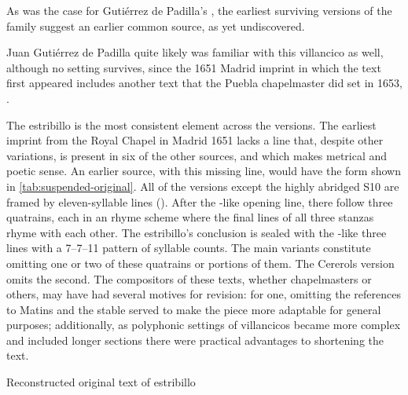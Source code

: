 As was the case for Gutiérrez de Padilla's , the earliest
surviving versions of the  family suggest an earlier
common source, as yet undiscovered.%
\begin{Footnote}
    Juan Gutiérrez de Padilla quite likely was familiar with this villancico as
    well, although no setting survives, since the 1651 Madrid imprint in which
    the text first appeared includes another text that the Puebla chapelmaster
    did set in 1653, .
\end{Footnote}
The  estribillo is the most consistent element across
the versions.
The earliest imprint from the Royal Chapel in Madrid 1651 lacks a line that,
despite other variations, is present in six of the other sources, and which
makes metrical and poetic sense.
An earlier source, with this missing line, would have the form shown in
\cref{tab:suspended-original}.
All of the versions except the highly abridged S10 are framed by eleven-syllable
lines ().
After the -like opening line, there follow three quatrains, each
in an  rhyme scheme where the final lines of all three stanzas rhyme
with each other.
The estribillo's conclusion is sealed with the -like three lines with
a 7--7--11 pattern of syllable counts.
The main variants constitute omitting one or two of these quatrains or portions
of them.
The Cererols version omits the second.
The compositors of these texts, whether chapelmasters or others, may have had
several motives for revision: for one, omitting the references to Matins 
 and the stable served to make the piece more adaptable for
general purposes; additionally, as polyphonic settings of villancicos became
more complex and included longer sections there were practical advantages to
shortening the text.

{Reconstructed original text of  estribillo}

